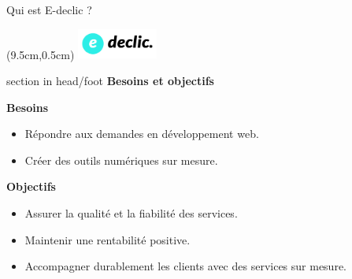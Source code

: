 \documentclass{beamer}
\newcommand{\logoEdeclic}{
	\begin{textblock*}{2cm}(9.5cm,0.5cm)
  		\includegraphics[height=1cm]{../img/logo_e-declic.png}
	\end{textblock*}
}
\begin{document}
\begin{frame}{Qui est E-declic ?}
	\logoEdeclic
	
	\begin{beamercolorbox}[wd=\paperwidth,ht=1.5em,dp=0.5em,leftskip=0.5cm]{section in head/foot}
  		\large \textbf{Besoins et objectifs}
	\end{beamercolorbox}
	\vspace{0.5em}
	\begin{center}
  		\begin{minipage}{0.9\textwidth}
			\textbf{Besoins}
			\begin{itemize}
				\item Répondre aux demandes en développement web.
				\item Créer des outils numériques sur mesure.
			\end{itemize}
	
			\pause	
	
			\textbf{Objectifs}
			\begin{itemize}
				\item Assurer la qualité et la fiabilité des services.
				\item Maintenir une rentabilité positive.
				\item Accompagner durablement les clients avec des services sur mesure.
			\end{itemize}
  		\end{minipage}
	\end{center}
	\vfill
\end{frame}
\end{document}
